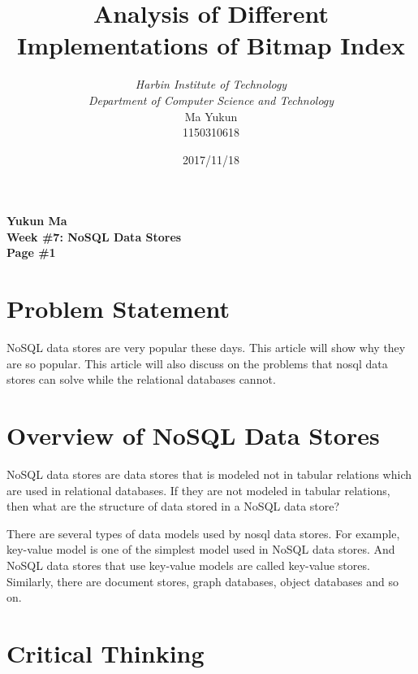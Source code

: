 \documentclass[12pt, a4paper]{article}
\begin{document}
\title{{\bf\Huge Analysis of Different Implementations of Bitmap Index}}
\author{\emph{Harbin Institute of Technology}\\\emph{Department of Computer Science and Technology}\\Ma Yukun\\1150310618}

\date{2017/11/18}

\nocite{*}


\begin{center}
{\textbf{
Yukun Ma\\
Week \#7: NoSQL Data Stores\\
Page \#1}}
\end{center}

\section{Problem Statement}

NoSQL data stores are very popular these days. This article will show why they are so popular. This article will also discuss on the problems that nosql data stores can solve while the relational databases cannot.




\section{Overview of NoSQL Data Stores}

NoSQL data stores are data stores that is modeled not in tabular relations which are used in relational databases.\cite{wiki} If they are not modeled in tabular relations, then what are the structure of data stored in a NoSQL data store?

There are several types of data models used by nosql data stores. For example, key-value model is one of the simplest model used in NoSQL data stores.\cite{wiki} And NoSQL data stores that use key-value models are called key-value stores. Similarly, there are document stores, graph databases, object databases and so on.

\section{Critical Thinking}
\end{document}

